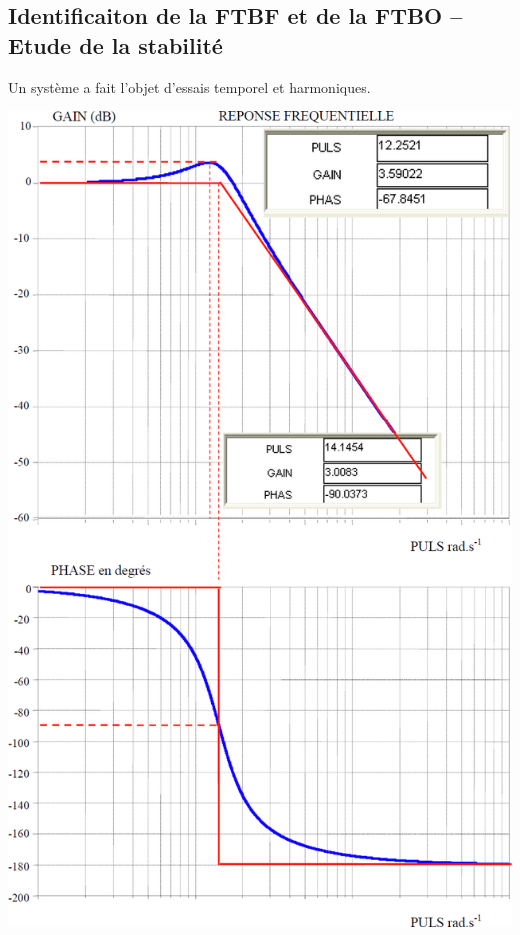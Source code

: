 \documentclass[10pt,fleqn]{article} %
\begin{document}
\def\pathfig{images}

\vspace{6cm}
\pagestyle{fancy}
\thispagestyle{plain}

\def\columnseprulecolor{\color{ocre}}
\setlength{\columnseprule}{0.4pt} 

\def\pathfig{images}

\begin{multicols}{2}
\subsection*{Identificaiton de la FTBF et de la FTBO -- Etude de la stabilité}
Un système a fait l’objet d’essais temporel et harmoniques.

\begin{center}
\includegraphics[width=\linewidth]{images/fig_03}
\end{center}



\end{multicols}
\end{document}
